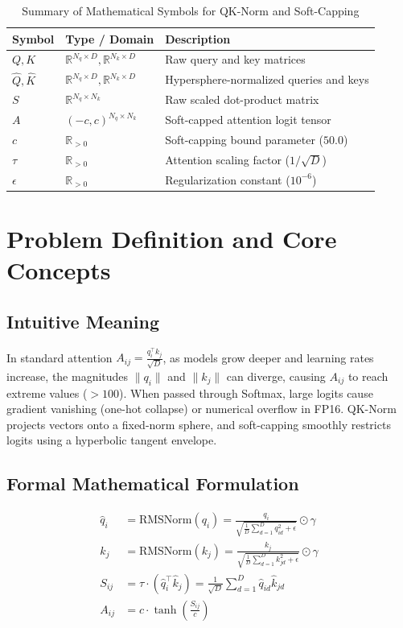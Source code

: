 \documentclass[11pt,a4paper]{article}
\theoremstyle{definition}
\begin{document}
\begin{table}[h]
\centering
\caption{Summary of Mathematical Symbols for QK-Norm and Soft-Capping}
\begin{tabular}{lll}
\toprule
\textbf{Symbol} & \textbf{Type / Domain} & \textbf{Description} \\
\midrule
$Q, K$ & $\mathbb{R}^{N_q \times D}, \mathbb{R}^{N_k \times D}$ & Raw query and key matrices \\
$\hat{Q}, \hat{K}$ & $\mathbb{R}^{N_q \times D}, \mathbb{R}^{N_k \times D}$ & Hypersphere-normalized queries and keys \\
$S$ & $\mathbb{R}^{N_q \times N_k}$ & Raw scaled dot-product matrix \\
$A$ & $(-c, c)^{N_q \times N_k}$ & Soft-capped attention logit tensor \\
$c$ & $\mathbb{R}_{> 0}$ & Soft-capping bound parameter ($50.0$) \\
$\tau$ & $\mathbb{R}_{> 0}$ & Attention scaling factor ($1/\sqrt{D}$) \\
$\epsilon$ & $\mathbb{R}_{> 0}$ & Regularization constant ($10^{-6}$) \\
\bottomrule
\end{tabular}
\end{table}

\section{Problem Definition and Core Concepts}

\subsection{Intuitive Meaning}
In standard attention $A_{ij} = \frac{q_i^\top k_j}{\sqrt{D}}$, as models grow deeper and learning rates increase, the magnitudes $\|q_i\|$ and $\|k_j\|$ can diverge, causing $A_{ij}$ to reach extreme values ($> 100$). When passed through Softmax, large logits cause gradient vanishing (one-hot collapse) or numerical overflow in FP16. QK-Norm projects vectors onto a fixed-norm sphere, and soft-capping smoothly restricts logits using a hyperbolic tangent envelope.

\subsection{Formal Mathematical Formulation}
\begin{align}
\hat{q}_i &= \text{RMSNorm}(q_i) = \frac{q_i}{\sqrt{\frac{1}{D} \sum_{d=1}^D q_{id}^2 + \epsilon}} \odot \gamma \\
\hat{k}_j &= \text{RMSNorm}(k_j) = \frac{k_j}{\sqrt{\frac{1}{D} \sum_{d=1}^D k_{jd}^2 + \epsilon}} \odot \gamma \\
S_{ij} &= \tau \cdot (\hat{q}_i^\top \hat{k}_j) = \frac{1}{\sqrt{D}} \sum_{d=1}^D \hat{q}_{id} \hat{k}_{jd} \\
A_{ij} &= c \cdot \tanh\left( \frac{S_{ij}}{c} \right)
\end{align}
\end{document}
